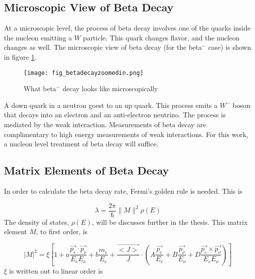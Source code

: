 \documentclass[../MaxHughesThesis.tex]{subfiles}
\begin{document}
\subsection{Microscopic View of Beta Decay}
At a microscopic level, the process of beta decay involves one of the quarks inside the nucleon emitting a $W$ particle.
This quark changes flavor, and the nucleon changes as well. 
The microscopic view of beta decay (for the beta$^{-}$ case) is shown in figure \ref{fig:betadecaymicro}.

\begin{figure}[!htb]
	\centerline{\texttt{[image: fig\_betadecayzoomedin.png]}}
	\caption{What beta$^{-}$ decay looks like microscopically}
	\label{fig:betadecaymicro}
\end{figure}
A down quark in a neutron goest to an up quark.
This process emits a $W^{-}$ boson that decays into an electron and an anti-electron neutrino.
The process is mediated by the weak interaction.
Measurements of beta decay are complimentary to high energy measurements of weak interactions.
For this work, a nucleon level treatment of beta decay will suffice.  

\subsection{Matrix Elements of Beta Decay}
In order to calculate the beta decay rate, Fermi's golden rule is needed.
This is %

\begin{equation}
	\lambda = \frac{2\pi}{\hbar}\|M\|^{2}\rho(E)
	\label{eq:fgr}
\end{equation}
The density of states, $\rho(E)$, will be discusses further in the thesis. 
This matrix element $M$, to first order, is \cite{Gon19} %

\begin{equation}
	|M|^{2} = \xi [1 + a \frac{\vec{p_{e}} \cdot \vec{p_{\nu}}} {E_{e} E_{\nu}}  +  b \frac{m_{e}}{E_{e}} + \frac{\vec{<J>}}{J} \cdot (A \frac{ \vec{p_{e}} }{E_{e}} + B \frac{\vec{p_{\nu}}}{E_{\nu}} + D \frac{\vec{p_{e}} \times \vec{p_{\nu}}}{E_{e} E_{\nu}})]
	\label{eq:matrixelement}
\end{equation}
$\xi$ is written out to linear order is %
 
\end{document}
